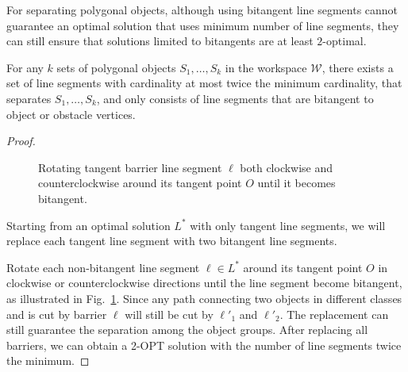 For separating polygonal objects, although using bitangent line segments cannot guarantee an optimal solution that uses minimum number of line segments, they can still ensure that solutions limited to bitangents are at least $2$-optimal.
\begin{proposition}
For any $k$ sets of polygonal objects $S_1, \dots, S_k$ in the workspace $\mathcal W$, there exists a set of line segments with cardinality at most twice the minimum cardinality, that separates $S_1, \dots, S_k$, and only consists of line segments that are bitangent to object or obstacle vertices. 
\end{proposition}
\begin{proof}


\begin{figure}[ht]
    \centering
{}
    \caption{Rotating tangent barrier line segment $\ell$ both clockwise and counterclockwise around its tangent point $O$ until it becomes bitangent.}
    \label{fig:proof_bi_2opt}
\end{figure}

Starting from an optimal solution $L^*$ with only tangent line segments,
we will replace each tangent line segment with two bitangent line segments.

Rotate each non-bitangent line segment $\ell\in L^*$ around its tangent point $O$ in clockwise or counterclockwise directions until the line segment become bitangent, as illustrated in Fig.~\ref{fig:proof_bi_2opt}. 
Since any path connecting two objects in different classes and is cut by barrier $\ell$ will still be cut by $\ell'_1$ and $\ell'_2$.
The replacement can still guarantee the separation among the object groups.
After replacing all barriers, we can obtain a 2-OPT solution with the number of line segments twice the minimum.
\end{proof}

